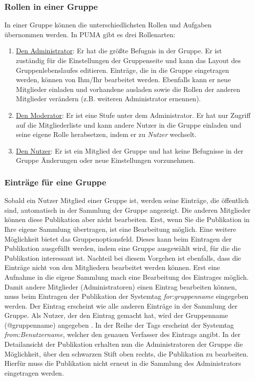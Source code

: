 \subsubsection{Rollen in einer Gruppe}
In einer Gruppe können die unterschiedlichsten Rollen und Aufgaben übernommen werden. In PUMA gibt es drei Rollenarten:
\begin{enumerate}
    \item \underline{Den Administrator}: Er hat die größte Befugnis in der Gruppe. Er ist zuständig für die Einstellungen der Gruppenseite und kann das Layout des Gruppenlebenslaufes editieren. Einträge, die in die Gruppe eingetragen werden, können von Ihm/Ihr bearbeitet werden. Ebenfalls kann er neue Mitglieder einladen und vorhandene ausladen sowie die Rollen der anderen Mitglieder verändern (z.B. weiteren Administrator ernennen).
    \item \underline{Den Moderator}: Er ist eine Stufe unter dem Administrator. Er hat nur Zugriff auf die Mitgliederliste und kann andere Nutzer in die Gruppe einladen und seine eigene Rolle herabsetzen, indem er zu \textit{Nutzer} wechselt.
    \item \underline{Den Nutzer}: Er ist ein Mitglied der Gruppe und hat keine Befugnisse in der Gruppe Änderungen oder neue Einstellungen vorzunehmen.
\end{enumerate}
\subsubsection{Einträge für eine Gruppe}
Sobald ein Nutzer Mitglied einer Gruppe ist, werden seine Einträge, die öffentlich sind, automatisch in der Sammlung der Gruppe angezeigt. Die anderen Mitglieder können diese Publikation aber nicht bearbeiten. Erst, wenn Sie die Publikation in Ihre eigene Sammlung übertragen, ist eine Bearbeitung möglich. Eine weitere Möglichkeit bietet das Gruppenoptionsfeld. Dieses kann beim Eintragen der Publikation ausgefüllt werden, indem eine Gruppe ausgewählt wird, für die die Publikation interessant ist. Nachteil bei diesem Vorgehen ist ebenfalls, dass die Einträge nicht von den Mitgliedern bearbeitet werden können. Erst eine Aufnahme in die eigene Sammlung mach eine Bearbeitung des Eintrages möglich.\newline  
Damit andere Mitglieder (Administratoren) einen Eintrag bearbeiten können, muss beim Eintragen der Publikation der Systemtag \textit{for:gruppenname} eingegeben werden. Der Eintrag erscheint wie alle anderen Einträge in der Sammlung der Gruppe. Als Nutzer, der den Eintrag gemacht hat, wird der Gruppenname (@gruppenname) angegeben . In der Reihe der Tags erscheint der Systemtag \textit{from:Benutzername}, welcher den genauen Verfasser des Eintrags angibt. In der Detailansicht der Publikation erhalten nun die Administratoren der Gruppe die Möglichkeit, über den schwarzen Stift oben rechts, die Publikation zu bearbeiten. Hierfür muss die Publikation nicht erneut in die Sammlung des Administrators eingetragen werden.

